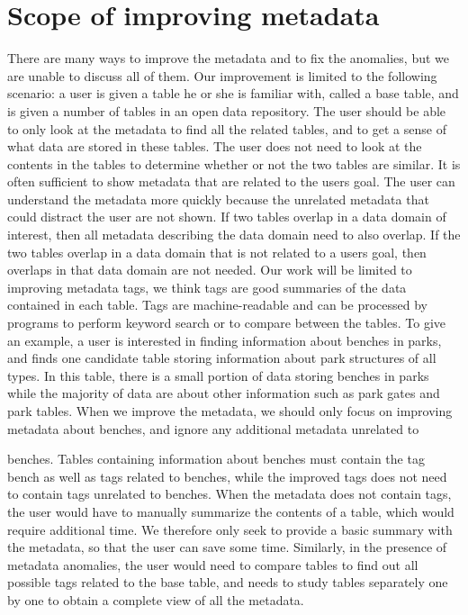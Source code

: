 \section{Scope of improving metadata}
\label{sec:ScopeOfImprovingMetadata}

There are many ways to improve the metadata and to fix the anomalies, but we are unable to discuss all of them. Our improvement is limited to the following scenario: a user is given a table he or she is familiar with, called a base table, and is given a number of tables in an open data repository. The user should be able to only look at the metadata to find all the related tables, and to get a sense of what data are stored in these tables. The user does not need to look at the contents in the tables to determine whether or not the two tables are similar.
It is often sufficient to show metadata that are related to the users goal. The user can understand the metadata more quickly because the unrelated metadata that could distract the user are not shown. If two tables overlap in a data domain of interest, then all metadata describing the data domain need to also overlap. If the two tables overlap in a data domain that is not related to a users goal, then overlaps in that data domain are not needed. Our work will be limited to improving metadata tags, we think tags are good summaries of the data contained in each table. Tags are machine-readable and can be processed by programs to perform keyword search or to compare between the tables.
To give an example, a user is interested in finding information about benches in parks, and finds one candidate table storing information about park structures of all types. In this table, there is a small portion of data storing benches in parks while the majority of data are about other information such as park gates and park tables. When we improve the metadata, we should only focus on improving metadata about benches, and ignore any additional metadata unrelated to


benches. Tables containing information about benches must contain the tag bench as well as tags related to benches, while the improved tags does not need to contain tags unrelated to benches.
When the metadata does not contain tags, the user would have to manually summarize the contents of a table, which would require additional time. We therefore only seek to provide a basic summary with the metadata, so that the user can save some time. Similarly, in the presence of metadata anomalies, the user would need to compare tables to find out all possible tags related to the base table, and needs to study tables separately one by one to obtain a complete view of all the metadata.


